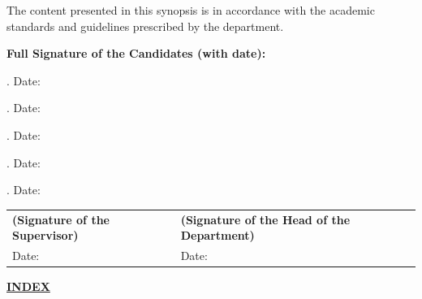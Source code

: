 \documentclass[12pt,a4paper]{article}
\begin{document}
\vspace{0.15in}
\noindent The content presented in this synopsis is in accordance with the academic standards and guidelines prescribed by the department.

\vspace{0.6in}
\noindent\textbf{Full Signature of the Candidates (with date):}
\vspace{0.2in}

. \underline{\hspace{2.2in}} \hfill Date: \underline{\hspace{1.2in}}

\vspace{0.15in}
. \underline{\hspace{2.2in}} \hfill Date: \underline{\hspace{1.2in}}

\vspace{0.15in}
. \underline{\hspace{2.2in}} \hfill Date: \underline{\hspace{1.2in}}

\vspace{0.15in}
. \underline{\hspace{2.2in}} \hfill Date: \underline{\hspace{1.2in}}

\vspace{0.15in}
. \underline{\hspace{2.2in}} \hfill Date: \underline{\hspace{1.2in}}

\vfill
\noindent
\begin{tabular}{@{}p{2.8in}p{3.0in}@{}}
\textbf{(Signature of the Supervisor)} & \textbf{(Signature of the Head of the Department)} \\
Date: & Date:
\end{tabular}
\vspace{0.15in}

\newpage
\thispagestyle{empty}
\begin{center}
    {\fontsize{14pt}{17pt}\bfseries \underline{INDEX} \par}
\end{center}
\vspace{0.15in}
\end{document}
